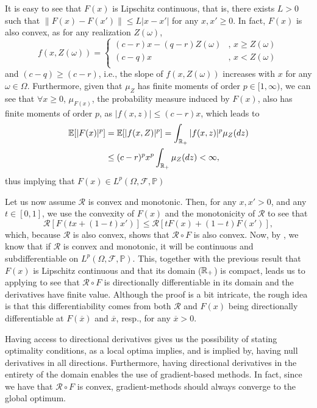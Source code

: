 \documentclass[12pt]{article}
\begin{document}
It is easy to see that $F(x)$ is Lipschitz continuous, that is, there exists $L>0$ such that $\|F(x)-F(x')\| \le L |x-x'|$ for any $x,x'\ge 0$.
In fact, $F(x)$ is also convex, as for any realization $Z(\omega)$, \[
    f(x,Z(\omega)) = \begin{cases}
	(c-r)x - (q-r)Z(\omega) &,\, x \ge Z(\omega) \\
	(c-q)x &,\, x < Z(\omega) \\
    \end{cases}
\] and $(c-q) \ge (c-r)$, i.e., the slope of $f(x,Z(\omega))$ increases with $x$ for any $\omega \in \Omega$.
Furthermore, given that $\mu_Z$ has finite moments of order $p \in [1,\infty)$, we can see that $\forall x\ge 0$, $\mu_{F(x)}$, the probability measure induced by $F(x)$, also has finite moments of order $p$, as $|f(x,z)| \le (c-r)x$, which leads to
\begin{align*}
    \mathbb{E}[|F(x)|^{p}] &= \mathbb{E}[|f(x,Z)|^{p}] = \int_{\mathbb{R}_{+}} |f(x,z)|^{p} \mu_Z(dz) \\
    &\le  (c-r)^{p} x^{p} \int_{\mathbb{R}_{+}} \mu_Z(dz) < \infty
,\end{align*}
thus implying that $F(x) \in L^{p}\left(\Omega, \mathcal{F}, \mathbb{P}\right)$

Let us now assume $\mathcal{R}$ is convex and monotonic.
Then, for any $x,x'>0$, and any $t\in [0,1]$, we use the convexity of $F(x)$ and the monotonicity of $\mathcal{R}$ to see that \[
    \mathcal{R}[F(tx + (1-t)x')] \le \mathcal{R}[tF(x) + (1-t)F(x')]
,\] which, because $\mathcal{R}$ is also convex, shows that $\mathcal{R} \circ F$ is also convex.
Now, by \citep[Proposition~6.5]{shapiroLecturesStochasticProgramming2009}, we know that if $\mathcal{R}$ is convex and monotonic, it will be continuous and subdifferentiable on $L^{p}\left( \Omega, \mathcal{F},\mathbb{P} \right)$.
This, together with the previous result that $F(x)$ is Lipschitz continuous and that its domain ($\mathbb{R}_+$) is compact, leads us to applying \citet[Theorem~6.10]{shapiroLecturesStochasticProgramming2009} to see that $\mathcal{R} \circ F$ is directionally differentiable in its domain and the derivatives have finite value.
Although the proof is a bit intricate, the rough idea is that this differentiability comes from both $\mathcal{R}$ and $F(x)$ being directionally differentiable at $F(\overline{x})$ and $\overline{x}$, resp., for any $\overline{x}>0$.

Having access to directional derivatives gives us the possibility of stating optimality conditions, as a local optima implies, and is implied by, having null derivatives in all directions.
Furthermore, having directional derivatives in the entirety of the domain enables the use of gradient-based methods.
In fact, since we have that $\mathcal{R} \circ F$ is convex, gradient-methods should always converge to the global optimum.
\end{document}
